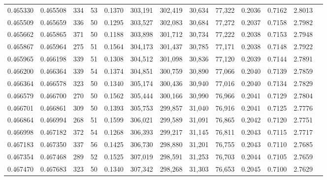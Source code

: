 \begin{tabular}{rrrrrrrrrrrrr}
0.465330 & 0.465508 &   334 &  53 &                                     0.1370 & 303,191 & 302,419 &  30,634 &  77,322 & 0.2036 & 0.7162 & 2.8013 \\
0.465509 & 0.465659 &   336 &  50 &                                     0.1295 & 303,527 & 302,083 &  30,684 &  77,272 & 0.2037 & 0.7158 & 2.7982 \\
0.465662 & 0.465865 &   371 &  50 &                                     0.1188 & 303,898 & 301,712 &  30,734 &  77,222 & 0.2038 & 0.7153 & 2.7948 \\
0.465867 & 0.465964 &   275 &  51 &                                     0.1564 & 304,173 & 301,437 &  30,785 &  77,171 & 0.2038 & 0.7148 & 2.7922 \\
0.465965 & 0.466198 &   339 &  51 &                                     0.1308 & 304,512 & 301,098 &  30,836 &  77,120 & 0.2039 & 0.7144 & 2.7891 \\
0.466200 & 0.466364 &   339 &  54 &                                     0.1374 & 304,851 & 300,759 &  30,890 &  77,066 & 0.2040 & 0.7139 & 2.7859 \\
0.466364 & 0.466578 &   323 &  50 &                                     0.1340 & 305,174 & 300,436 &  30,940 &  77,016 & 0.2040 & 0.7134 & 2.7829 \\
0.466579 & 0.466700 &   270 &  50 &                                     0.1562 & 305,444 & 300,166 &  30,990 &  76,966 & 0.2041 & 0.7129 & 2.7804 \\
0.466701 & 0.466861 &   309 &  50 &                                     0.1393 & 305,753 & 299,857 &  31,040 &  76,916 & 0.2041 & 0.7125 & 2.7776 \\
0.466864 & 0.466994 &   268 &  51 &                                     0.1599 & 306,021 & 299,589 &  31,091 &  76,865 & 0.2042 & 0.7120 & 2.7751 \\
0.466998 & 0.467182 &   372 &  54 &                                     0.1268 & 306,393 & 299,217 &  31,145 &  76,811 & 0.2043 & 0.7115 & 2.7717 \\
0.467183 & 0.467350 &   337 &  56 &                                     0.1425 & 306,730 & 298,880 &  31,201 &  76,755 & 0.2043 & 0.7110 & 2.7685 \\
0.467354 & 0.467468 &   289 &  52 &                                     0.1525 & 307,019 & 298,591 &  31,253 &  76,703 & 0.2044 & 0.7105 & 2.7659 \\
0.467470 & 0.467683 &   323 &  50 &                                     0.1340 & 307,342 & 298,268 &  31,303 &  76,653 & 0.2045 & 0.7100 & 2.7629 \\

\end{tabular}
